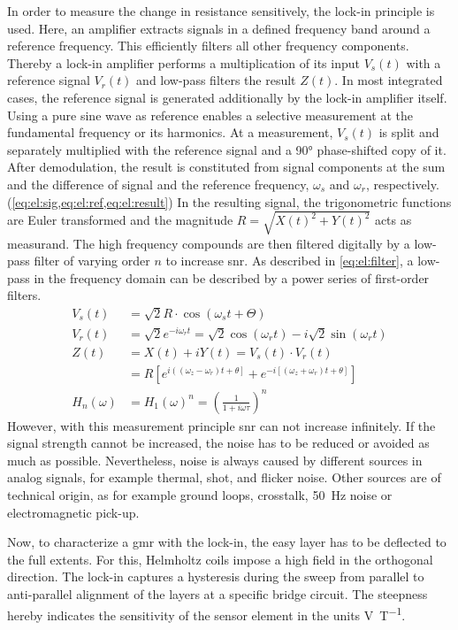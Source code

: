 In order to measure the change in resistance sensitively, the lock-in principle is used. Here, an amplifier extracts signals in a defined frequency band around a reference frequency. This efficiently filters all other frequency components. Thereby a lock-in amplifier performs a multiplication of its input $V_s(t)$ with a reference signal $V_r(t)$ and low-pass filters the result $Z(t)$. In most integrated cases, the reference signal is generated additionally by the lock-in amplifier itself. Using a pure sine wave as reference enables a selective measurement at the fundamental frequency or its harmonics.\cite{lit:nano:lockin} At a measurement, $V_s(t)$ is split and separately multiplied with the reference signal and a \ang{90} phase-shifted copy of it. After demodulation, the result is constituted from signal components at the sum and the difference of signal and the reference frequency, $\omega_{s}$ and $\omega_{r}$, respectively.(\cref{eq:el:sig,eq:el:ref,eq:el:result}) In the resulting signal, the trigonometric functions are Euler transformed and the magnitude $R=\sqrt{X(t)^2+Y(t)^2}$ acts as measurand. The high frequency compounds are then filtered digitally by a low-pass filter of varying order $n$ to increase \gls{snr}. As described in \cref{eq:el:filter}, a low-pass in the frequency domain can be described by a power series of first-order filters.
\begin{align}
		V_{s}(t) &=\sqrt{2} R \cdot \cos \left(\omega_{s} t+\Theta\right) \label{eq:el:sig} \\
	V_{r}(t)&=\sqrt{2} e^{-i \omega_{r} t}=\sqrt{2} \cos \left(\omega_{r} t\right)-i \sqrt{2} \sin \left(\omega_{r} t\right) \label{eq:el:ref}\\
	Z(t) &=X(t)+i Y(t)=V_{s}(t) \cdot V_{r}(t) \label{eq:el:result} \\
		&=R\left[e^{i\left(\left(\omega_{z}-\omega_{r}\right) t+\theta\right]}+e^{-i\left[\left(\omega_{z}+\omega_{r}\right) t+\theta\right]}\right] \\
		H_{n}(\omega)&=H_{1}(\omega)^{n}=\left(\frac{1}{1+i \omega \tau}\right)^{n} \label{eq:el:filter}
\end{align}
However, with this measurement principle \gls{snr} can not increase infinitely. If the signal strength cannot be increased, the noise  has to be reduced or avoided as much as possible. Nevertheless, noise is always caused by different sources in analog signals, for example thermal, shot, and flicker noise. Other sources are of technical origin, as for example ground loops, crosstalk, \SI{50}{\hertz} noise or electromagnetic pick-up. \cite{lit:nano:lockin}

Now, to characterize a \gls{gmr} with the lock-in, the easy layer has to be deflected to the full extents. For this, Helmholtz coils impose a high field in the orthogonal direction. The lock-in captures a hysteresis during the sweep from parallel to anti-parallel alignment of the layers at a specific bridge circuit. The steepness hereby indicates the sensitivity of the sensor element in the units \si{\volt\per\tesla}.


